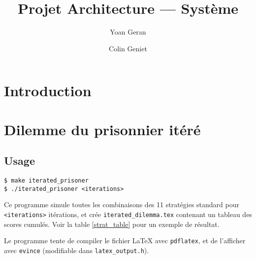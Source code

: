 \documentclass[10pt]{article}
\title{Projet Architecture --- Système}
\author{Yoan Geran \and Colin Geniet}
\begin{document}
\maketitle
\tableofcontents

\section*{Introduction}

\section{Dilemme du prisonnier itéré}
\subsection{Usage}
\begin{verbatim}
$ make iterated_prisoner
$ ./iterated_prisoner <iterations>
\end{verbatim}

Ce programme simule toutes les combinaisons des 11 stratégies standard pour \verb|<iterations>| itérations,
et crée \verb|iterated_dilemma.tex| contenant un tableau des scores cumulés.
Voir la table \ref{strat_table} pour un exemple de résultat.

Le programme tente de compiler le fichier \LaTeX{} avec \verb|pdflatex|, et de l'afficher avec \verb|evince|
(modifiable dans \verb|latex_output.h|).
\end{document}
